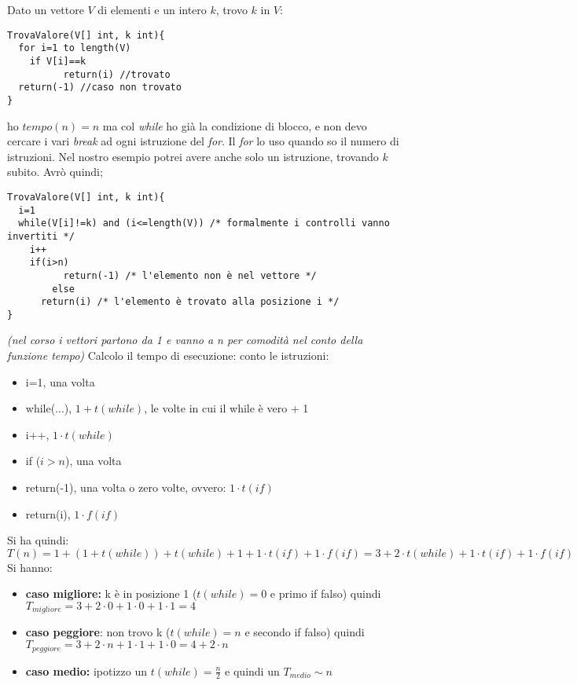 \documentclass[a4paper,12pt,oneside,tikz]{book}
\begin{document}
\begin{esempio}
	Dato un vettore $V$ di elementi e un intero $k$, trovo $k$ in $V$:
	\begin{verbatim}
TrovaValore(V[] int, k int){
  for i=1 to length(V)
    if V[i]==k
    	  return(i) //trovato
  return(-1) //caso non trovato 
}
\end{verbatim}
	ho $tempo(n)=n$
	ma col \textit{while} ho già la condizione di blocco, e non devo cercare i vari \textit{break} ad ogni istruzione del \textit{for}. Il \textit{for} lo uso quando so il numero di istruzioni. Nel nostro esempio potrei avere anche solo un istruzione, trovando $k$ subito. Avrò quindi;
	\begin{verbatim}
TrovaValore(V[] int, k int){
  i=1
  while(V[i]!=k) and (i<=length(V)) /* formalmente i controlli vanno invertiti */
    i++
    if(i>n)
    	  return(-1) /* l'elemento non è nel vettore */
    	else
      return(i) /* l'elemento è trovato alla posizione i */
}
\end{verbatim}
	\textit{(nel corso i vettori partono da 1 e vanno a n per comodità nel conto della funzione tempo)}
	Calcolo il tempo di esecuzione:
	conto le istruzioni:
	\begin{itemize}
		\item i=1, una volta
		\item while(...), $1 + t(while)$, le volte in cui il while è vero + 1
		\item i++, $1\cdot t(while)$
		\item if ($i>n$), una volta
		\item return(-1), una volta o zero volte, ovvero: $1\cdot t(if)$
		\item return(i), $1\cdot f(if)$
	\end{itemize}
	Si ha quindi:$$T(n)= 1 +(1+t(while)) + t(while) + 1 + 1\cdot t(if) + 1\cdot f(if)= 3+2\cdot t(while)+1\cdot t(if)+1\cdot f(if)$$
	Si hanno:
	\begin{itemize}
		\item \textbf{caso migliore:} k è in posizione 1 ($t(while)=0$ e primo if falso) quindi $T_{migliore}=3+2\cdot 0 + 1\cdot 0 +1 \cdot 1=4$
		\item \textbf{caso peggiore}: non trovo k ($t(while)=n$ e secondo if falso) quindi $T_{peggiore }=3+2\cdot n + 1\cdot 1 +1 \cdot 0=4+2\cdot n$
		\item \textbf{caso medio:} ipotizzo un $t(while)=\frac{n}{2}$ e quindi un $T_{medio}\sim n$
	\end{itemize}
\end{esempio}
\end{document}
